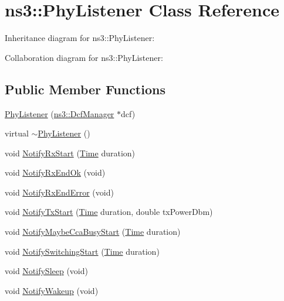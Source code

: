 \hypertarget{classns3_1_1PhyListener}{}\section{ns3\+:\+:Phy\+Listener Class Reference}
\label{classns3_1_1PhyListener}


Inheritance diagram for ns3\+:\+:Phy\+Listener\+:


Collaboration diagram for ns3\+:\+:Phy\+Listener\+:
\subsection*{Public Member Functions}
\begin{DoxyCompactItemize}
\item 
\hyperlink{classns3_1_1PhyListener_a69a4d169221f53f68748ce655fcd6457}{Phy\+Listener} (\hyperlink{classns3_1_1DcfManager}{ns3\+::\+Dcf\+Manager} $\ast$dcf)
\item 
virtual \hyperlink{classns3_1_1PhyListener_ae2ca2738655f661900bf946f9c929a50}{$\sim$\+Phy\+Listener} ()
\item 
void \hyperlink{classns3_1_1PhyListener_afe631afd9702794114c1a1951ae5e448}{Notify\+Rx\+Start} (\hyperlink{classns3_1_1Time}{Time} duration)
\item 
void \hyperlink{classns3_1_1PhyListener_a525ec55a8958cbbd9baa9968ff9adfef}{Notify\+Rx\+End\+Ok} (void)
\item 
void \hyperlink{classns3_1_1PhyListener_a07ac53b0d59ce22b0ef6368ebac1da94}{Notify\+Rx\+End\+Error} (void)
\item 
void \hyperlink{classns3_1_1PhyListener_abb3ba3252562c813884760b46aeb0426}{Notify\+Tx\+Start} (\hyperlink{classns3_1_1Time}{Time} duration, double tx\+Power\+Dbm)
\item 
void \hyperlink{classns3_1_1PhyListener_a9426df05b7b07a9b4abc4a0888259d7b}{Notify\+Maybe\+Cca\+Busy\+Start} (\hyperlink{classns3_1_1Time}{Time} duration)
\item 
void \hyperlink{classns3_1_1PhyListener_a03faeaeb984cba7a659184f653d61cf7}{Notify\+Switching\+Start} (\hyperlink{classns3_1_1Time}{Time} duration)
\item 
void \hyperlink{classns3_1_1PhyListener_ac7e04a3d674ddd32c95a4ae8b6343f9b}{Notify\+Sleep} (void)
\item 
void \hyperlink{classns3_1_1PhyListener_a8c97d1059902d38919ad501a3243f31a}{Notify\+Wakeup} (void)
\end{DoxyCompactItemize}
